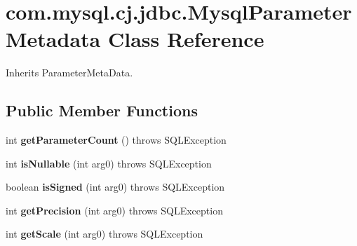 \hypertarget{classcom_1_1mysql_1_1cj_1_1jdbc_1_1_mysql_parameter_metadata}{}\section{com.\+mysql.\+cj.\+jdbc.\+Mysql\+Parameter\+Metadata Class Reference}
\label{classcom_1_1mysql_1_1cj_1_1jdbc_1_1_mysql_parameter_metadata}


Inherits Parameter\+Meta\+Data.

\subsection*{Public Member Functions}
\begin{DoxyCompactItemize}
\item 
\mbox{\label{classcom_1_1mysql_1_1cj_1_1jdbc_1_1_mysql_parameter_metadata_a2fa32005faabf66ca5bb70be1021f16a}} 
int {\bfseries get\+Parameter\+Count} ()  throws S\+Q\+L\+Exception 
\item 
\mbox{\label{classcom_1_1mysql_1_1cj_1_1jdbc_1_1_mysql_parameter_metadata_aa47fbc3b32addcebc2b7c3decb902ae1}} 
int {\bfseries is\+Nullable} (int arg0)  throws S\+Q\+L\+Exception 
\item 
\mbox{\label{classcom_1_1mysql_1_1cj_1_1jdbc_1_1_mysql_parameter_metadata_af921abbd27a6f5ea0e0d2fa8a5c9c151}} 
boolean {\bfseries is\+Signed} (int arg0)  throws S\+Q\+L\+Exception 
\item 
\mbox{\label{classcom_1_1mysql_1_1cj_1_1jdbc_1_1_mysql_parameter_metadata_af2d81c72f7be005a971f83669a8cc237}} 
int {\bfseries get\+Precision} (int arg0)  throws S\+Q\+L\+Exception 
\item 
\mbox{\label{classcom_1_1mysql_1_1cj_1_1jdbc_1_1_mysql_parameter_metadata_a763084a92b67fa528a05dea0c3cf7755}} 
int {\bfseries get\+Scale} (int arg0)  throws S\+Q\+L\+Exception 
\item 
\mbox{\label{classcom_1_1mysql_1_1cj_1_1jdbc_1_1_mysql_parameter_metadata_ad52cd0add986cbe7a5df141620eb25eb}} 

\end{DoxyCompactItemize}
